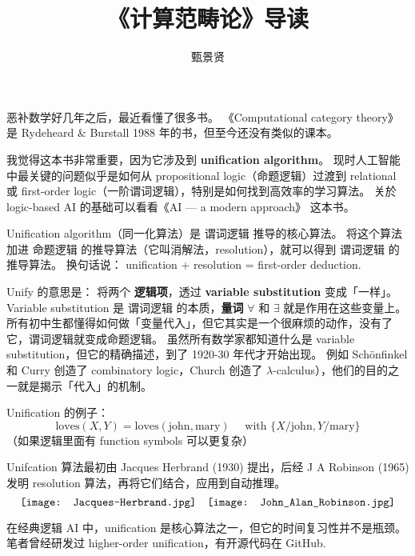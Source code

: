 \documentclass[12pt, orivec]{article}
\title{《计算范畴论》导读}
\author{甄景贤}
\begin{document}
\setlength{\parindent}{0pt}
\setlength{\parskip}{2.8ex plus0.8ex minus0.8ex}

\maketitle

恶补数学好几年之后，最近看懂了很多书。 《Computational category theory》 
是 Rydeheard \& Burstall 1988 年的书，但至今还没有类似的课本。  

我觉得这本书非常重要，因为它涉及到 \textbf{unification algorithm}。  现时人工智能中最关键的问题似乎是如何从 propositional logic（命题逻辑）过渡到 relational 或 first-order logic（一阶谓词逻辑），特别是如何找到高效率的学习算法。  关於 logic-based AI 的基础可以看看《AI --- a modern approach》 这本书。  

Unification algorithm（同一化算法）是 谓词逻辑 推导的核心算法。  将这个算法加进 命题逻辑 的推导算法（它叫消解法，resolution），就可以得到 谓词逻辑 的推导算法。  换句话说： unification + resolution = first-order deduction.

Unify 的意思是： 将两个 \textbf{逻辑项}，透过 \textbf{variable substitution} 变成「一样」。  Variable substitution 是 谓词逻辑 的本质，\textbf{量词} $\forall$ 和 $\exists$ 就是作用在这些变量上。  所有初中生都懂得如何做「变量代入」，但它其实是一个很麻烦的动作，没有了它，谓词逻辑就变成命题逻辑。  虽然所有数学家都知道什么是 variable substitution，但它的精确描述，到了 1920-30 年代才开始出现。 例如 Sch\"{o}nfinkel 和 Curry 创造了 combinatory logic，Church 创造了 $\lambda$-calculus），他们的目的之一就是揭示「代入」的机制。 

Unification 的例子：
\begin{equation}
\mbox{loves}(X,Y) = \mbox{loves}(\mbox{john}, \mbox{mary}) \quad \mbox{ with } \{ X/\mbox{john}, Y/\mbox{mary} \}
\end{equation}
（如果逻辑里面有 function symbols 可以更复杂）

Unifcation 算法最初由 Jacques Herbrand (1930) 提出，后经 J A Robinson (1965) 发明 resolution 算法，再将它们结合，应用到自动推理。 
\begin{equation}
\vcenter{\hbox{\texttt{[image: Jacques-Herbrand.jpg]}}} \quad
\vcenter{\hbox{\texttt{[image: John\_Alan\_Robinson.jpg]}}} \nonumber
\end{equation}

在经典逻辑 AI 中，unification 是核心算法之一，但它的时间复习性并不是瓶颈。  笔者曾经研发过 higher-order unification，有开源代码在 GitHub.
\end{document}
